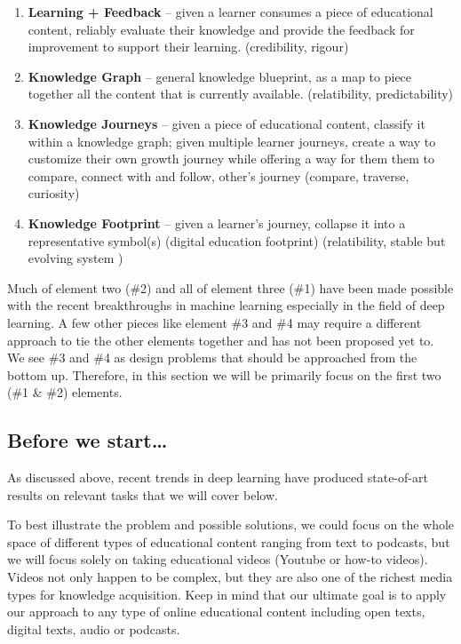 \documentclass[]{book}
\theoremstyle{definition}
\theoremstyle{definition}
\theoremstyle{definition}
\theoremstyle{remark}
\begin{document}
\begin{enumerate}
\def\labelenumi{\arabic{enumi}.}
\item
  \textbf{Learning + Feedback} -- given a learner consumes a piece of
  educational content, reliably evaluate their knowledge and provide the
  feedback for improvement to support their learning. (credibility,
  rigour)
\item
  \textbf{Knowledge Graph} -- general knowledge blueprint, as a map to
  piece together all the content that is currently available.
  (relatibility, predictability)
\item
  \textbf{Knowledge Journeys} -- given a piece of educational content,
  classify it within a knowledge graph; given multiple learner journeys,
  create a way to customize their own growth journey while offering a
  way for them them to compare, connect with and follow, other's journey
  (compare, traverse, curiosity)
\item
  \textbf{Knowledge Footprint} -- given a learner's journey, collapse it
  into a representative symbol(s) (digital education footprint)
  (relatibility, stable but evolving system )
\end{enumerate}

Much of element two (\#2) and all of element three (\#1) have been made
possible with the recent breakthroughs in machine learning especially in
the field of deep learning. A few other pieces like element \#3 and \#4
may require a different approach to tie the other elements together and
has not been proposed yet to. We see \#3 and \#4 as design problems that
should be approached from the bottom up. Therefore, in this section we
will be primarily focus on the first two (\#1 \& \#2) elements.

\subsection{Before we start\ldots{}}\label{before-we-start}

As discussed above, recent trends in deep learning have produced
state-of-art results on relevant tasks that we will cover below.

To best illustrate the problem and possible solutions, we could focus on
the whole space of different types of educational content ranging from
text to podcasts, but we will focus solely on taking educational videos
(Youtube or how-to videos). Videos not only happen to be complex, but
they are also one of the richest media types for knowledge acquisition.
Keep in mind that our ultimate goal is to apply our approach to any type
of online educational content including open texts, digital texts, audio
or podcasts.
\end{document}
